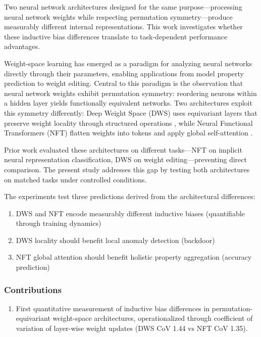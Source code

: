 
Two neural network architectures designed for the same purpose---processing neural network weights while respecting permutation symmetry---produce measurably different internal representations. This work investigates whether these inductive bias differences translate to task-dependent performance advantages.

Weight-space learning has emerged as a paradigm for analyzing neural networks directly through their parameters, enabling applications from model property prediction to weight editing. Central to this paradigm is the observation that neural network weights exhibit permutation symmetry: reordering neurons within a hidden layer yields functionally equivalent networks. Two architectures exploit this symmetry differently: Deep Weight Space (DWS) uses equivariant layers that preserve weight locality through structured operations \citep{navon2023dws}, while Neural Functional Transformers (NFT) flatten weights into tokens and apply global self-attention \citep{zhou2024nft}.

Prior work evaluated these architectures on different tasks---NFT on implicit neural representation classification, DWS on weight editing---preventing direct comparison. The present study addresses this gap by testing both architectures on matched tasks under controlled conditions.

The experiments test three predictions derived from the architectural differences:

\begin{enumerate}
\item DWS and NFT encode measurably different inductive biases (quantifiable through training dynamics)
\item DWS locality should benefit local anomaly detection (backdoor)
\item NFT global attention should benefit holistic property aggregation (accuracy prediction)
\end{enumerate}

\subsubsection{Contributions}

\begin{enumerate}
\item First quantitative measurement of inductive bias differences in permutation-equivariant weight-space architectures, operationalized through coefficient of variation of layer-wise weight updates (DWS CoV 1.44 vs NFT CoV 1.35).
\end{enumerate}

